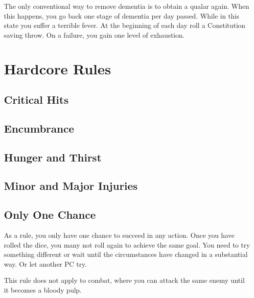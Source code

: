 The only conventional way to remove dementia is to obtain a qualar again.
When this happens, you go back one stage of dementia per day passed.
While in this state you suffer a terrible fever.
At the beginning of each day roll a Constitution saving throw.
On a failure, you gain one level of exhaustion.

\section{Hardcore Rules}
\subsection*{Critical Hits}

\subsection*{Encumbrance}

\subsection*{Hunger and Thirst}

\subsection*{Minor and Major Injuries}

\subsection*{Only One Chance}
As a rule, you only have one chance to succeed in any action.
Once you have rolled the dice, you many not roll again to achieve the same goal.
You need to try something different or wait until the circumstances have changed in a substantial way.
Or let another PC try.

This rule does not apply to combat, where you can attack the same enemy until it becomes a bloody pulp.

